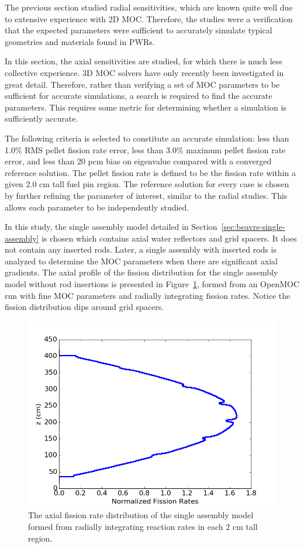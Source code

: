 The previous section studied radial sensitivities, which are known quite well due to extensive experience with 2D \ac{MOC}. Therefore, the studies were a verification that the expected parameters were sufficient to accurately simulate typical geometries and materials found in \acp{PWR}. 

In this section, the axial sensitivities are studied, for which there is much less collective experience. 3D \ac{MOC} solvers have only recently been investigated in great detail. Therefore, rather than verifying a set of \ac{MOC} parameters to be sufficient for accurate simulations, a search is required to find the accurate parameters. This requires some metric for determining whether a simulation is sufficiently accurate.

The following criteria is selected to constitute an accurate simulation: less than 1.0\% \ac{RMS} pellet fission rate error, less than 3.0\% maximum pellet fission rate error, and less than 20 pcm bias on eigenvalue compared with a converged reference solution. The pellet fission rate is defined to be the fission rate within a given 2.0 cm tall fuel pin region. The reference solution for every case is chosen by further refining the parameter of interest, similar to the radial studies. This allows each parameter to be independently studied.

In this study, the single assembly model detailed in Section~\ref{sec:beavrs-single-assembly} is chosen which contains axial water reflectors and grid spacers. It does not contain any inserted rods. Later, a single assembly with inserted rods is analyzed to determine the \ac{MOC} parameters when there are significant axial gradients. The axial profile of the fission distribution for the single assembly model without rod insertions is presented in Figure~\ref{fig:single-assembly-axial}, formed from an OpenMOC run with fine \ac{MOC} parameters and radially integrating fission rates. Notice the fission distribution dips around grid spacers.

\begin{figure}[h!]
	\centering
	\includegraphics[width=0.7\linewidth]{figures/results/rr-plots/single-assembly-axial.png}
	\caption[]{The axial fission rate distribution of the single assembly model formed from radially integrating reaction rates in each 2 cm tall region.}
	\label{fig:single-assembly-axial}
\end{figure}

